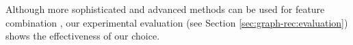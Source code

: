 Although more sophisticated and advanced methods can be used for feature combination \citep{Beliakov2015}, our experimental evaluation (see Section \ref{sec:graph-rec:evaluation}) shows the effectiveness of our choice.   
%





